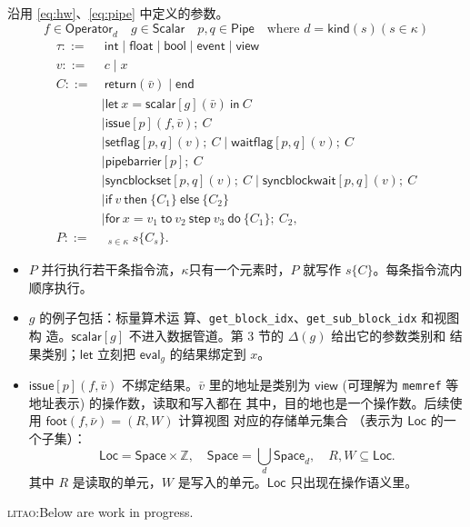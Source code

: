 \documentclass[UTF8,a4paper,11pt,fontset=fandol]{ctexart}
\newcommand{\kw}[1]{\ensuremath{\mathsf{#1}}}
\newcommand{\an}[3]{{\color{#2} \textsc{#1}:#3}}
\newcommand{\litao}[1]{\an{litao}{red}{#1}}
\begin{document}
沿用 \eqref{eq:hw}、\eqref{eq:pipe} 中定义的参数。
\[f\in\mathsf{Operator}_d
\quad g\in\mathsf{Scalar}
\quad p,q\in\mathsf{Pipe}
\quad \text{where } d = \mathsf{kind}(s) (s \in \kappa)
\]
\[
\begin{aligned}
\tau ::={}
  &\ \mathsf{int}\mid\mathsf{float}\mid\mathsf{bool}\mid\mathsf{event}\mid\mathsf{view}\\
v ::={}
  &\ c\mid x\\
C ::={}
  &\ \kw{return}(\bar v)
   \mid \kw{end}\\
  &\mid \kw{let}\ x=\kw{scalar}[g](\bar v)\ \kw{in}\ C\\
  &\mid \kw{issue}[p](f,\bar v);\ C\\
  &\mid \kw{setflag}[p,q](v);\ C
   \mid \kw{waitflag}[p,q](v);\ C\\
  &\mid \kw{pipebarrier}[p];\ C\\
  &\mid \kw{syncblockset}[p,q](v);\ C
   \mid \kw{syncblockwait}[p,q](v);\ C\\
  &\mid \kw{if}\ v\ \kw{then}\ \{C_1\}\ \kw{else}\ \{C_2\}\\
  &\mid \kw{for}\ x=v_1\ \kw{to}\ v_2\ \kw{step}\ v_3\ \kw{do}\ \{C_1\};\ C_2,\\[0.3em]
P ::={}
  &\ \mathop{\Big\|}_{s\in\kappa} s\{C_s\}.
\end{aligned}
\]

\begin{itemize}
  \item $P$ 并行执行若干条指令流，$\kappa$只有一个元素时，$P$ 就写作
  $s\{C\}$。每条指令流内顺序执行。
  \item $g$ 的例子包括：标量算术运
  算、\texttt{get\_block\_idx}、\texttt{get\_sub\_block\_idx} 和视图构
  造。$\kw{scalar}[g]$ 不进入数据管道。第 3 节的 $\Delta(g)$ 给出它的参数类别和
  结果类别；$\kw{let}$ 立刻把 $\mathsf{eval}_g$ 的结果绑定到 $x$。
  \item $\kw{issue}[p](f,\bar v)$ 不绑定结果。$\bar v$ 里的地址是类别为
  $\mathsf{view}$ (可理解为 \texttt{memref} 等地址表示) 的操作数，读取和写入都在
  其中，目的地也是一个操作数。后续使用 $\mathsf{foot}(f,\bar\nu)=(R,W)$ 计算视图
  对应的存储单元集合 （表示为 $\mathsf{Loc}$ 的一个子集）：
  \[
  \mathsf{Loc}=\mathsf{Space}\times\mathbb Z,\quad
  \mathsf{Space}=\bigcup_d\mathsf{Space}_d,\quad
  R,W\subseteq\mathsf{Loc}.
  \]
  其中 $R$ 是读取的单元，$W$ 是写入的单元。$\mathsf{Loc}$ 只出现在操作语义里。
\end{itemize}


\litao{Below are work in progress.}
\end{document}
